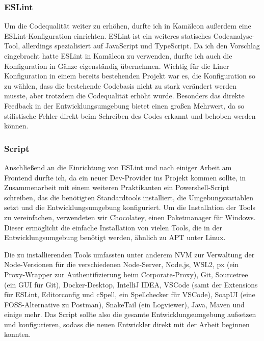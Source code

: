 \documentclass[11pt, a4paper, oneside]{scrartcl}
\begin{document}
            \subsubsection{ESLint}
            Um die Codequalität weiter zu erhöhen, durfte ich in Kamäleon außerdem eine
            ESLint-Konfiguration einrichten.
            ESLint ist ein weiteres statisches Codeanalyse-Tool,
            allerdings spezialisiert auf JavaScript und TypeScript.
            Da ich den Vorschlag eingebracht hatte ESLint in Kamäleon zu verwenden,
            durfte ich auch die Konfiguration in Gänze eigenständig übernehmen.
            Wichtig für die Liner Konfiguration in einem bereits bestehenden Projekt war es,
            die Konfiguration so zu wählen,
            dass die bestehende Codebasis nicht zu stark verändert werden musste,
            aber trotzdem die Codequalität erhöht wurde.
            Besonders das direkte Feedback in der Entwicklungsumgebung bietet einen großen Mehrwert,
            da so stilistische Fehler direkt beim Schreiben des Codes erkannt und behoben werden
            können.

            \subsubsection{Script}
            Anschließend an die Einrichtung von ESLint und nach einiger Arbeit am Frontend
            durfte ich, da ein neuer Dev-Provider ins Projekt kommen sollte,
            in Zusammenarbeit mit einem weiteren Praktikanten ein Powershell-Script schreiben,
            das die benötigten Standardtools installiert, die Umgebungsvariablen setzt und die
            Entwicklungsumgebung konfiguriert.
            Um die Installation der Tools zu vereinfachen, verwendeten wir Chocolatey,
            einen Paketmanager für Windows.
            Dieser ermöglicht die einfache Installation von vielen Tools,
            die in der Entwicklungsumgebung benötigt werden, ähnlich zu APT unter Linux.\par
            Die zu installierenden Tools umfassten unter anderem NVM zur Verwaltung der
            Node-Versionen für die verschiedenen Node-Server, Node.js, WSL2, px
            (ein Proxy-Wrapper zur Authentifizierung beim Corporate-Proxy), Git, Sourcetree
            (ein GUI für Git), Docker-Desktop, IntelliJ IDEA, VSCode
            (samt der Extensions für ESLint, Editorconfig und cSpell, ein Spellchecker für VSCode),
            SoapUI (eine FOSS-Alternative zu Postman), SnakeTail (ein Logviewer), Java, Maven und
            einige mehr.
            Das Script sollte also die gesamte Entwicklungsumgebung aufsetzen und konfigurieren,
            sodass die neuen Entwickler direkt mit der Arbeit beginnen konnten.
\end{document}
